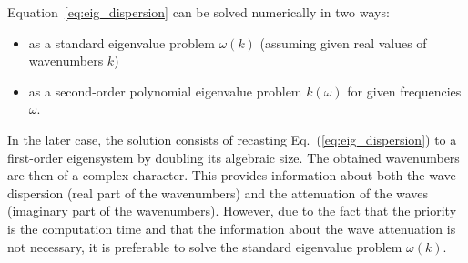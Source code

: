 \documentclass[preprint,12pt]{elsarticle}
\begin{document}
	Equation~\ref{eq:eig_dispersion} can be solved numerically in two ways:
	\begin{itemize}
		\item as a standard eigenvalue problem \(\omega (k)\) (assuming given real values 
		of wavenumbers \(k\))
		\item as a second-order polynomial eigenvalue problem \(k(\omega)\) for given 
		frequencies \(\omega\).
	\end{itemize}
In the later case, the solution consists of recasting Eq.~(\ref{eq:eig_dispersion}) to a 
first-order eigensystem by doubling its algebraic size.  The obtained wavenumbers are 
then of a complex character. This provides information about both the wave dispersion 
(real part of the wavenumbers) and the attenuation of the waves (imaginary part of the 
wavenumbers).  However, due to the fact that the priority is the computation time and 
that the information about the wave attenuation is not necessary, it is preferable to 
solve the standard eigenvalue problem \(\omega (k)\).
\end{document}
